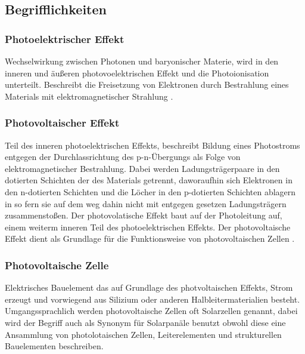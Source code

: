 \subsection{Begrifflichkeiten}
    \subsubsection{Photoelektrischer Effekt}
        Wechselwirkung zwischen Photonen und baryonischer Materie,
        wird in den inneren und äußeren photovoelektrischen Effekt
        und die Photoionisation unterteilt. Beschreibt die Freisetzung
        von Elektronen durch Bestrahlung eines Materials mit
        elektromagnetischer Strahlung \cite{Wiki_PhotoelectricEffect}.

    \subsubsection{Photovoltaischer Effekt}
        Teil des inneren photoelektrischen Effekts, beschreibt Bildung
        eines Photostroms entgegen der Durchlassrichtung des p-n-Übergungs
        als Folge von elektromagnetischer Bestrahlung. Dabei werden
        Ladungsträgerpaare in den dotierten Schichten der des Materials
        getrennt, daworaufhin sich Elektronen in den n-dotierten
        Schichten und die Löcher in den p-dotierten Schichten ablagern
        in so fern sie auf dem weg dahin nicht mit entgegen gesetzen
        Ladungsträgern zusammenstoßen. Der photovolatische Effekt baut
        auf der Photoleitung auf, einem weiterm inneren Teil des
        photoelektrischen Effekts. Der photovoltaische Effekt dient
        als Grundlage für die Funktionsweise von photovoltaischen Zellen
        \cite{Wiki_PhotoelectricEffect}.

    \subsubsection{Photovoltaische Zelle}
        Elektrisches Bauelement das auf Grundlage des photvoltaischen
        Effekts, Strom erzeugt und vorwiegend aus Silizium oder anderen
        Halbleitermaterialien besteht.\\
        Umgangssprachlich werden photovoltaische Zellen oft Solarzellen
        genannt, dabei wird der Begriff auch als Synonym für Solarpanäle
        benutzt obwohl diese eine Ansammlung von photolotaischen Zellen,
        Leiterelementen und strukturellen Bauelementen beschreiben.

\newpage

